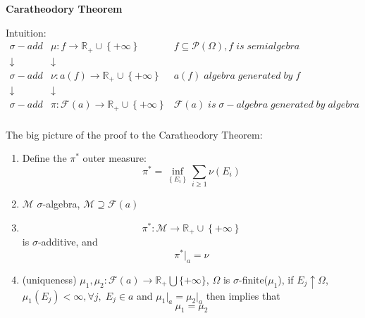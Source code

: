 \setcounter{lecture}{4}

\begin{center}
	\Large \bf Caratheodory Theorem
\end{center}

\vspace{0.25cm}

Intuition:
\begin{equation}
\begin{matrix}
{\sigma-add} & {\mu :f \to {\mathbb{R}_ + } \cup \left\{ { + \infty } \right\}} & {f \subseteq \mathcal{P}\left( \Omega  \right),f\;is\;semialgebra}  \\ 
\downarrow  &  \downarrow  & {}  \\ 
{\sigma-add} & {\nu :a\left( f \right) \to {\mathbb{R}_ + } \cup \left\{ { + \infty } \right\}} & {a\left( f \right)\;algebra \; generated \; by \; f}  \\ 
\downarrow  &  \downarrow  & {}  \\ 
{\sigma-add} & {\pi :\mathcal{F}\left( a \right) \to {\mathbb{R}_ + } \cup \left\{ { + \infty } \right\}} & {\mathcal{F}\left( a \right)\; is \; \sigma  - algebra\;generated\;by\;algebra}  \\ 
\end{matrix}
\label{eq4.1} 
\end{equation}

The big picture of the proof to the  Caratheodory Theorem:
\begin{enumerate}
	\item  Define the $ {\pi ^*} $ outer measure:
	\begin{equation}
	{\pi ^*} = \mathop {\inf }\limits_{\left\{ {{E_i}} \right\}} \sum\limits_{i \geqslant 1} {\nu \left( {{E_i}} \right)} 
	\label{eq4.2} 
	\end{equation}
	\item  $ \mathcal{M} $ $ \sigma $-algebra, $ \mathcal{M} \supseteq \mathcal{F}\left(a\right) $
	\item 
	\begin{equation}
	{\pi ^*}:\mathcal{M} \to {\mathbb{R}_ + } \cup \left\{ { + \infty } \right\}
	\label{eq4.3} 
	\end{equation}
	is $ \sigma $-additive, and 
	\begin{equation}
	{\pi ^*}{|_a} = \nu
	\label{eq4.4} 
	\end{equation}
	\item (uniqueness) $ \mu_{1},\mu_{2}: \mathcal{F}\left(a\right) \to \mathbb{R}_{+}\bigcup \{+\infty\} $, $ \Omega $ is $ \sigma $-finite($ \mu_{1} $), if $  E_{j} \uparrow \Omega $, ${\mu _1}\left( {{E_j}} \right) < \infty ,\forall j,\;{E_j} \in a$ and ${\mu _1}{|_a} = {\mu _2}{|_a}$ then implies that
	\begin{equation}
	{\mu _1} = {\mu _2}
	\label{eq4.5} 
	\end{equation}
\end{enumerate}
 
